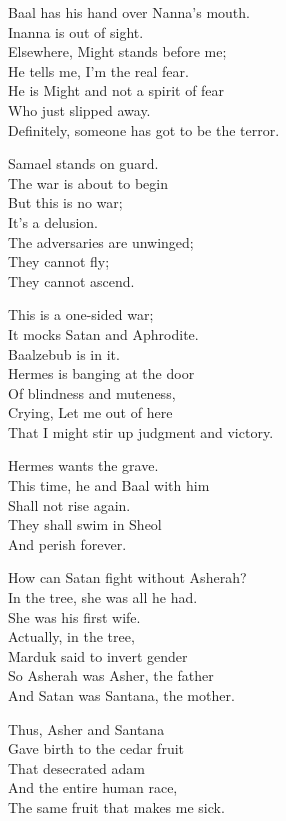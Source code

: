 \documentclass[
]{book}
\begin{document}
Baal has his hand over Nanna's mouth.\\
Inanna is out of sight.\\
Elsewhere, Might stands before me;\\
He tells me, I'm the real fear.\\
He is Might and not a spirit of fear\\
Who just slipped away.\\
Definitely, someone has got to be the terror.

Samael stands on guard.\\
The war is about to begin\\
But this is no war;\\
It's a delusion.\\
The adversaries are unwinged;\\
They cannot fly;\\
They cannot ascend.

This is a one-sided war;\\
It mocks Satan and Aphrodite.\\
Baalzebub is in it.\\
Hermes is banging at the door\\
Of blindness and muteness,\\
Crying, Let me out of here\\
That I might stir up judgment and victory.

Hermes wants the grave.\\
This time, he and Baal with him\\
Shall not rise again.\\
They shall swim in Sheol\\
And perish forever.

How can Satan fight without Asherah?\\
In the tree, she was all he had.\\
She was his first wife.\\
Actually, in the tree,\\
Marduk said to invert gender\\
So Asherah was Asher, the father\\
And Satan was Santana, the mother.

Thus, Asher and Santana\\
Gave birth to the cedar fruit\\
That desecrated adam\\
And the entire human race,\\
The same fruit that makes me sick.
\end{document}
